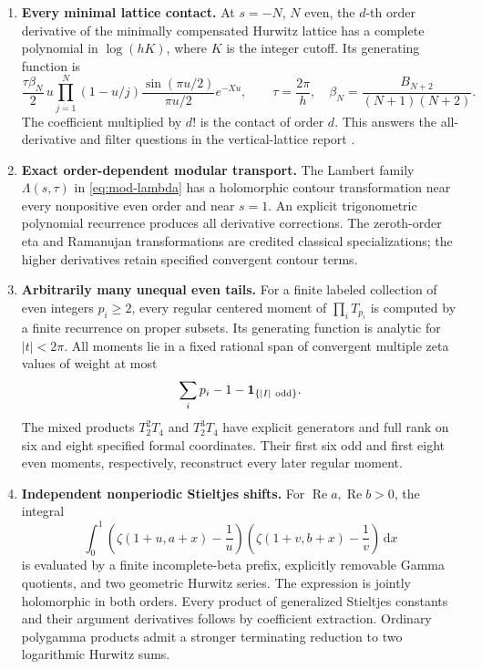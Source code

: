 \documentclass[11pt,letterpaper]{article}
\numberwithin{equation}{section}
\theoremstyle{definition}
\theoremstyle{remark}
\DeclareMathOperator{\Ree}{Re}
\newcommand{\dd}{\,\mathrm d}
\begin{document}
\begin{enumerate}[label=\textbf{\arabic*.},leftmargin=*]
\item \textbf{Every minimal lattice contact.}
At \(s=-N\), \(N\) even, the \(d\)-th order derivative of the
minimally compensated Hurwitz lattice has a complete polynomial
in \(\log(hK)\), where \(K\) is the integer cutoff. Its generating
function is
\[
 \frac{\tau\beta_N}{2}\,
 u\prod_{j=1}^{N}(1-u/j)
 \frac{\sin(\pi u/2)}{\pi u/2}e^{-Xu},
 \qquad
 \tau=\frac{2\pi}{h},\quad
 \beta_N=\frac{B_{N+2}}{(N+1)(N+2)}.
\]
The coefficient multiplied by \(d!\) is the contact of order \(d\).
This answers the all-derivative and filter questions in the
vertical-lattice report \cite{RepoVertical}.

\item \textbf{Exact order-dependent modular transport.}
The Lambert family \(\Lambda(s,\tau)\) in
\eqref{eq:mod-lambda}
has a holomorphic contour transformation near every
nonpositive even order and near \(s=1\).
An explicit trigonometric polynomial recurrence produces all
derivative corrections. The zeroth-order eta and Ramanujan
transformations are credited classical specializations;
the higher derivatives retain specified convergent contour terms.

\item \textbf{Arbitrarily many unequal even tails.}
For a finite labeled collection of even integers \(p_i\ge2\),
every regular centered moment of
\(\prod_iT_{p_i}\) is computed by a finite recurrence on proper
subsets. Its generating function is analytic for \(|t|<2\pi\).
All moments lie in a fixed rational span of convergent multiple
zeta values of weight at most
\[
 \sum_i p_i-1-\mathbf1_{\{|I|\ {\rm odd}\}}.
\]
The mixed products \(T_2^2T_4\) and \(T_2^3T_4\) have explicit
generators and full rank on six and eight specified formal
coordinates. Their first six odd and first eight even moments,
respectively, reconstruct every later regular moment.

\item \textbf{Independent nonperiodic Stieltjes shifts.}
For \(\Ree a,\Ree b>0\), the integral
\[
 \int_0^1
   \left(\zeta(1+u,a+x)-\frac1u\right)
   \left(\zeta(1+v,b+x)-\frac1v\right)\dd x
\]
is evaluated by a finite incomplete-beta prefix, explicitly
removable Gamma quotients, and two geometric Hurwitz series.
The expression is jointly holomorphic in both orders.
Every product of generalized Stieltjes constants and their
argument derivatives follows by coefficient extraction.
Ordinary polygamma products admit a stronger terminating
reduction to two logarithmic Hurwitz sums.


\end{enumerate}
\end{document}
